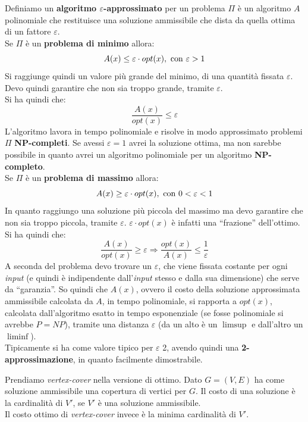\begin{definizione}
  Definiamo un \textbf{algoritmo $\varepsilon$-approssimato} per un problema
  $\Pi$ è un 
  algoritmo $A$ polinomiale che restituisce una soluzione ammissibile che dista
  da quella ottima di un fattore $\varepsilon$.\\
  Se $\Pi$ è un \textbf{problema di minimo} allora:
  \[A(x)\leq \varepsilon\cdot opt(x), \mbox{ \textnormal{con} }\varepsilon>1\]
  Si raggiunge quindi un valore più grande del minimo, di una quantità fissata
  $\varepsilon$. Devo quindi garantire che non sia troppo grande, tramite
  $\varepsilon$.\\
  Si ha quindi che:
  \[\frac{A(x)}{opt(x)}\leq \varepsilon\]
  L'algoritmo lavora in tempo polinomiale e risolve in modo approssimato
  problemi $\Pi$ \textbf{NP-completi}. Se avessi $\varepsilon=1$ avrei la
  soluzione ottima, ma non sarebbe possibile in quanto avrei un algoritmo
  polinomiale per un algoritmo \textbf{NP-completo}.\\
  Se $\Pi$ è un \textbf{problema di massimo} allora:
  \[A(x)\geq \varepsilon\cdot opt(x), \mbox{ \textnormal{con} }0<\varepsilon<1\]
  In quanto raggiungo una soluzione più piccola del massimo ma devo garantire
  che non sia troppo piccola, tramite $\varepsilon$. $\varepsilon\cdot opt(x)$ è
  infatti una ``frazione'' dell'ottimo.\\
  Si ha quindi che:
  \[\frac{A(x)}{opt(x)}\geq \varepsilon\Longrightarrow\frac{opt(x)}{A(x)}\leq
    \frac{1}{\varepsilon}\]
  A seconda del problema devo trovare un $\varepsilon$, che viene fissata
  costante per ogni \textit{input} (e quindi è indipendente dall'\textit{input} stesso e dalla sua
  dimensione) che serve da ``garanzia''. So quindi che $A(x)$, ovvero il costo
  della soluzione approssimata ammissibile calcolata da $A$, in tempo
  polinomiale, si rapporta a $opt(x)$, calcolata dall'algoritmo esatto in tempo
  esponenziale (se fosse polinomiale si avrebbe $P=NP$), tramite una distanza
  $\varepsilon$ (da un alto è un $\limsup$ e dall'altro un $\liminf$).\\
  Tipicamente si ha come valore tipico per $\varepsilon$ 2, avendo quindi
  una \textbf{2-approssimazione}, in quanto facilmente dimostrabile.
\end{definizione}
\begin{esempio}
  Prendiamo \textit{vertex-cover} nella versione di ottimo. Dato $G=(V,E)$ ha
  come soluzione ammissibile una copertura di vertici per $G$. Il costo di una
  soluzione è la cardinalità di $V'$, se $V'$ è una soluzione ammissibile.\\
  Il costo ottimo di \textit{vertex-cover} invece è la minima cardinalità di
  $V'$.
\end{esempio}
